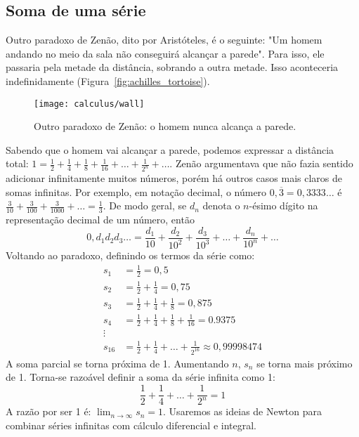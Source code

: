 \subsection{Soma de uma série}
Outro paradoxo de Zenão, dito por Aristóteles, é o seguinte: "Um homem andando no meio da sala não conseguirá alcançar a parede". Para isso, ele passaria pela metade da distância, sobrando a outra metade. Isso aconteceria indefinidamente (Figura~\ref{fig:achilles_tortoise}).
\begin{figure}[!ht]
	\centering
	\texttt{[image: calculus/wall]}
	\caption{Outro paradoxo de Zenão: o homem nunca alcança a parede.}
\end{figure}
Sabendo que o homem vai alcançar a parede, podemos expressar a distância total: $1=\frac{1}{2}+\frac{1}{4}+\frac{1}{8}+\frac{1}{16}+\dots+\frac{1}{2^n}+\dots$. Zenão argumentava que não fazia sentido adicionar infinitamente muitos números, porém há outros casos mais claros de somas infinitas. Por exemplo, em notação decimal, o número $0,\overline{3} = 0,3333\dots$ é $\frac{3}{10}+\frac{3}{100}+\frac{3}{1000}+\dots=\frac{1}{3}$. De modo geral, se $d_n$ denota o $n$-ésimo dígito na representação decimal de um número, então $$0,d_1d_2d_3\dots = \frac{d_1}{10}+\frac{d_2}{10^2}+\frac{d_3}{10^3}+\dots+\frac{d_n}{10^n}+\dots$$
Voltando ao paradoxo, definindo os termos da série como:$$\begin{aligned}
s_1 &= \frac{1}{2}= 0,5\\
s_2 &= \frac{1}{2}+\frac{1}{4} = 0,75\\
s_3 &= \frac{1}{2}+\frac{1}{4}+\frac{1}{8} = 0,875\\
s_4 &= \frac{1}{2}+\frac{1}{4}+\frac{1}{8}+\frac{1}{16}=0.9375\\
\vdots\\
s_{16} &= \frac{1}{2}+\frac{1}{4}+\dots+\frac{1}{2^{16}}\approx 0,99998474
\end{aligned}$$
A soma parcial se torna próxima de 1. Aumentando $n$, $s_n$ se torna mais próximo de 1. Torna-se razoável definir a soma da série infinita como 1: $$\frac{1}{2}+\frac{1}{4}+\dots+\frac{1}{2^n} = 1$$ A razão por ser 1 é: $\lim_{n\rightarrow\infty}s_n=1$. Usaremos as ideias de Newton para combinar séries infinitas com cálculo diferencial e integral. 
